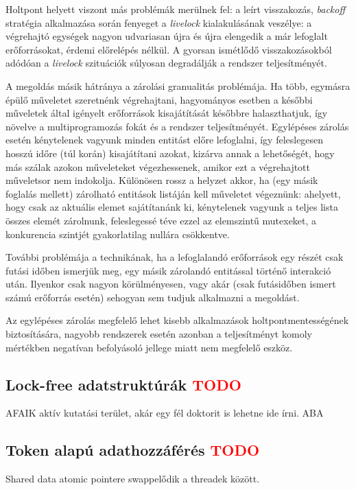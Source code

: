     Holtpont helyett viszont más problémák merülnek fel: a leírt visszakozás, \emph{backoff} stratégia alkalmazása során fenyeget a \emph{livelock} kialakulásának veszélye: a végrehajtó egységek nagyon udvariasan újra és újra elengedik a már lefoglalt erőforrásokat, érdemi előrelépés nélkül. A gyorsan ismétlődő visszakozásokból adódóan a \emph{livelock} szituációk súlyosan degradálják a rendszer teljesítményét.
    
    A megoldás másik hátránya a zárolási granualitás problémája. Ha több, egymásra épülő műveletet szeretnénk végrehajtani, hagyományos esetben a későbbi műveletek által igényelt erőforrások kisajátítását későbbre halaszthatjuk, így növelve a multiprogramozás fokát és a rendszer teljesítményét. Egylépéses zárolás esetén kénytelenek vagyunk minden entitást előre lefoglalni, így feleslegesen hosszú időre (túl korán) kisajátítani azokat, kizárva annak a lehetőségét, hogy más szálak azokon műveleteket végezhessenek, amikor ezt a végrehajtott műveletsor nem indokolja. Különösen rossz a helyzet akkor, ha (egy másik foglalás mellett) zárolható entitások listáján kell műveletet végeznünk: ahelyett, hogy csak az aktuális elemet sajátítanánk ki, kénytelenek vagyunk a teljes lista összes elemét zárolnunk, feleslegessé téve ezzel az elemszintű mutexeket, a konkurencia szintjét gyakorlatilag nullára csökkentve.
    
    További problémája a technikának, ha a lefoglalandó erőforrások egy részét csak futási időben ismerjük meg, egy másik zárolandó entitással történő interakció után. Ilyenkor csak nagyon körülményesen, vagy akár (csak futásidőben ismert számú erőforrás esetén) sehogyan sem tudjuk alkalmazni a megoldást.
    
    Az egylépéses zárolás megfelelő lehet kisebb alkalmazások holtpontmentességének biztosítására, nagyobb rendszerek esetén azonban a teljesítményt komoly mértékben negatívan befolyásoló jellege miatt nem megfelelő eszköz.
    
    \subsection{Lock-free adatstruktúrák \textcolor{red}{TODO}}
    \label{seq:lockfree}
     AFAIK aktív kutatási terület, akár egy fél doktorit is lehetne ide írni. ABA
    \subsection{Token alapú adathozzáférés \textcolor{red}{TODO}} Shared data atomic pointere swappelődik a threadek között.

